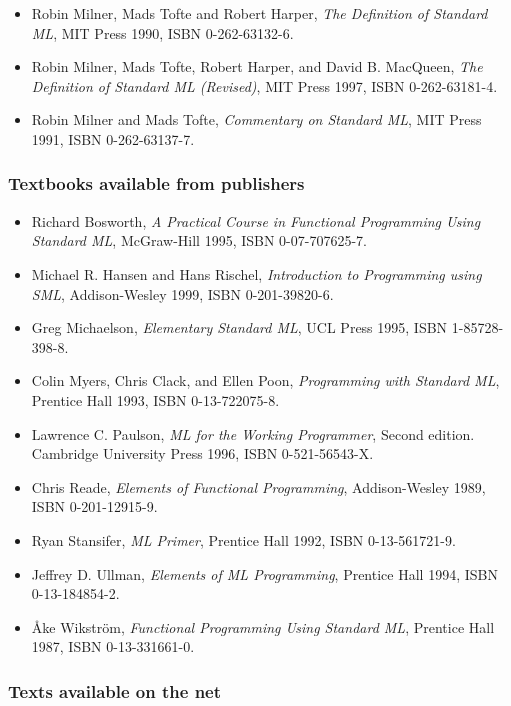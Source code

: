 \documentclass[fleqn]{article}
\begin{document}
\begin{itemize}
\item Robin Milner, Mads Tofte and Robert Harper, {\em The Definition of
  Standard ML\/}, MIT Press 1990, ISBN 0-262-63132-6.  
\item Robin Milner, Mads Tofte, Robert Harper, and David B. MacQueen,
  {\em The Definition of Standard ML (Revised)\/}, MIT Press 1997,
  ISBN 0-262-63181-4.
\item Robin Milner and Mads Tofte, {\em Commentary on Standard ML\/},
  MIT Press 1991, ISBN 0-262-63137-7.
\end{itemize}

\subsubsection*{Textbooks available from publishers}

\begin{itemize}
\item Richard Bosworth, {\em A Practical Course in Functional
    Programming Using Standard ML}, McGraw-Hill 1995, ISBN
  0-07-707625-7.
\item Michael R. Hansen and Hans Rischel, \emph{Introduction to
    Programming using SML}, Addison-Wesley 1999, ISBN 0-201-39820-6.
\item Greg Michaelson, {\em Elementary Standard ML\/}, UCL Press 1995,
  ISBN 1-85728-398-8.
\item Colin Myers, Chris Clack, and Ellen Poon, {\em Programming with
    Standard ML\/}, Prentice Hall 1993, ISBN 0-13-722075-8.
\item Lawrence C. Paulson, {\em ML for the Working Programmer\/},
  Second edition.  Cambridge University Press 1996, ISBN
  0-521-56543-X.  
\item Chris Reade, {\em Elements of Functional Programming\/},
  Addison-Wesley 1989, ISBN 0-201-12915-9.
\item Ryan Stansifer, {\em ML Primer\/}, Prentice Hall 1992, ISBN
  0-13-561721-9.
\item Jeffrey D. Ullman, {\em Elements of ML Programming\/}, Prentice
  Hall 1994, ISBN 0-13-184854-2.
\item {\AA}ke Wikstr{\"o}m, {\em Functional Programming Using Standard
    ML\/}, Prentice Hall 1987, ISBN 0-13-331661-0.
\end{itemize}

\subsubsection*{Texts available on the net}
\end{document}
